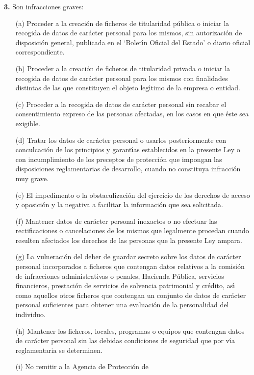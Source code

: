 {\bf 3.} Son infracciones graves: \begin{itemize} \item [(a)] Proceder a
la creaci\'on de ficheros de titularidad p\'ublica o iniciar la recogida
de datos de car\'acter personal para los mismos, sin autorizaci\'on
de disposici\'on general, publicada en el `Bolet\'{\i}n Oficial del
Estado' o diario oficial correspondiente.  \item [(b)] Proceder a la
creaci\'on de ficheros de titularidad privada o iniciar la recogida de
datos de car\'acter personal para los mismos con finalidades distintas
de las que constituyen el objeto leg\'{\i}timo de la empresa o entidad.
\item [(c)] Proceder a la recogida de datos de car\'acter personal sin
recabar el consentimiento expreso de las personas afectadas, en los casos
en que \'este sea exigible.  \item [(d)] Tratar los datos de car\'acter
personal o usarlos posteriormente con conculcaci\'on de los principios y
garant\'{\i}as establecidos en la presente Ley o con incumplimiento de los
preceptos de protecci\'on que impongan las disposiciones reglamentarias
de desarrollo, cuando no constituya infracci\'on muy grave.  \item [(e)]
El impedimento o la obstaculizaci\'on del ejercicio de los derechos de
acceso y oposici\'on y la negativa a facilitar la informaci\'on que sea
solicitada.  \item [(f)] Mantener datos de car\'acter personal inexactos
o no efectuar las rectificaciones o cancelaciones de los mismos que
legalmente procedan cuando resulten afectados los derechos de las personas
que la presente Ley ampara.  \item [(g)] La vulneraci\'on del deber de
guardar secreto sobre los datos de car\'acter personal incorporados a
ficheros que contengan datos relativos a la comisi\'on de infracciones
administrativas o penales, Hacienda P\'ublica, servicios financieros,
prestaci\'on de servicios de solvencia patrimonial y cr\'edito,
as\'{\i} como aquellos otros ficheros que contengan un conjunto de
datos de car\'acter personal suficientes para obtener una evaluaci\'on
de la personalidad del individuo.  \item [(h)] Mantener los ficheros,
locales, programas o equipos que contengan datos de car\'acter personal
sin las debidas condiciones de seguridad que por v\'{\i}a reglamentaria
se determinen.  \item [(i)] No remitir a la Agencia de Protecci\'on de

\end{itemize}

